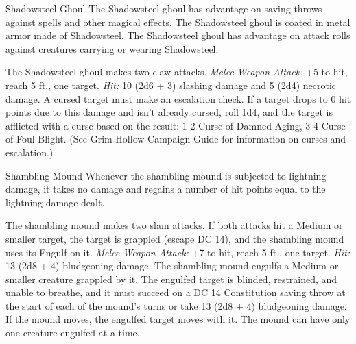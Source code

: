 \documentclass[10pt,a4paper,twoside,twocolumn,openany,bg=print,nodeprecatedcode]{dndbook}
\begin{document}
\begin{DndMonster}[float*=t]{Shadowsteel Ghoul}
\DndMonsterBasics[
armor-class = {15 (natural armor)},
hit-points = {\DndDice{10d8 + 20}},
speed = {30 ft.}
]
\DndMonsterAbilityScores[
 str = 16,
 dex = 12,
 con = 14,
 int = 9,
 wis = 10,
 cha = 6
]
\DndMonsterDetails[
saving-throws = {Wis +2},
skills = {Perception +2},
damage-immunities = {poison},
senses = {darkvision 120 ft., passive perception 12},
languages = {one language known in life},
challenge = 4,
]
The Shadowsteel ghoul has advantage on saving throws against spells and other magical effects.
The Shadowsteel ghoul is coated in metal armor made of Shadowsteel.
The Shadowsteel ghoul has advantage on attack rolls against creatures carrying or wearing Shadowsteel.
\par
{}
The Shadowsteel ghoul makes two claw attacks.
\textsl{Melee Weapon Attack:} +5 to hit, reach 5 ft., one target. \textsl{Hit:} 10 (2d6 + 3) slashing damage and 5 (2d4) necrotic damage. A cursed target must make an escalation check. If a target drops to 0 hit points due to this damage and isn't already cursed, roll 1d4, and the target is afflicted with a curse based on the result: 1-2 Curse of Damned Aging, 3-4 Curse of Foul Blight. (See Grim Hollow Campaign Guide for information on curses and escalation.)
\end{DndMonster}



\begin{DndMonster}[float*=t]{Shambling Mound}
\DndMonsterBasics[
armor-class = {15 (natural armor)},
hit-points = {\DndDice{16d10 + 48}},
speed = {20 ft., 20 ft. (key)}
]
\DndMonsterAbilityScores[
 str = 18,
 dex = 8,
 con = 16,
 int = 5,
 wis = 10,
 cha = 5
]
\DndMonsterDetails[
skills = {Stealth +2},
damage-resistances = {cold, fire},
damage-immunities = {lightning},
senses = {blindsight 60 ft. (blind beyond this radius), passive perception 10},
challenge = 5,
]
Whenever the shambling mound is subjected to lightning damage, it takes no damage and regains a number of hit points equal to the lightning damage dealt.
\par
{}
The shambling mound makes two slam attacks. If both attacks hit a Medium or smaller target, the target is grappled (escape DC 14), and the shambling mound uses its Engulf on it.
\textsl{Melee Weapon Attack:} +7 to hit, reach 5 ft., one target. \textsl{Hit:} 13 (2d8 + 4) bludgeoning damage.
The shambling mound engulfs a Medium or smaller creature grappled by it. The engulfed target is blinded, restrained, and unable to breathe, and it must succeed on a DC 14 Constitution saving throw at the start of each of the mound's turns or take 13 (2d8 + 4) bludgeoning damage. If the mound moves, the engulfed target moves with it. The mound can have only one creature engulfed at a time.
\end{DndMonster}
\end{document}
